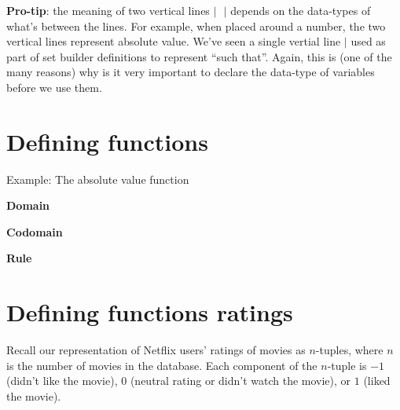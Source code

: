 \documentclass[12pt, oneside]{article}
\begin{document}
{\bf Pro-tip}: the meaning of two vertical lines $| ~~~ |$ depends on the data-types of what's between the lines.
For example, when placed around a number, the two vertical lines represent absolute value.
We've seen a single vertial line $|$ used as part of set builder definitions to represent ``such that''.
Again, this is 
(one of the many reasons) why is it very important to declare the data-type of variables before we use them.
 \vfill
\section*{Defining functions}



\vfill
\newpage

Example: The absolute value function 

{\bf Domain}

{\bf Codomain}

{\bf Rule}

\vfill 
 \vfill
\section*{Defining functions ratings}


Recall our representation of Netflix users' ratings of movies as $n$-tuples, where
$n$ is the number of movies in the database. 
Each component of the $n$-tuple is $-1$ (didn't like the movie), $0$ 
(neutral rating or didn't watch the movie), or $1$ (liked the movie).
\end{document}
